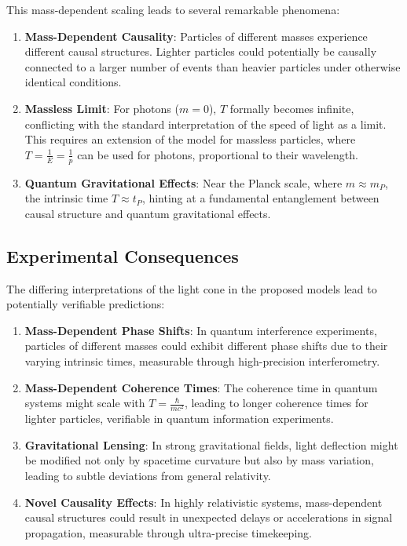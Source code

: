 \documentclass[a4paper,12pt]{article}
\begin{document}
	This mass-dependent scaling leads to several remarkable phenomena:
	
	\begin{enumerate}
		\item \textbf{Mass-Dependent Causality}: Particles of different masses experience different causal structures. Lighter particles could potentially be causally connected to a larger number of events than heavier particles under otherwise identical conditions.
		\item \textbf{Massless Limit}: For photons (\( m = 0 \)), \( T \) formally becomes infinite, conflicting with the standard interpretation of the speed of light as a limit. This requires an extension of the model for massless particles, where \( T = \frac{1}{E} = \frac{1}{p} \) can be used for photons, proportional to their wavelength.
		\item \textbf{Quantum Gravitational Effects}: Near the Planck scale, where \( m \approx m_P \), the intrinsic time \( T \approx t_P \), hinting at a fundamental entanglement between causal structure and quantum gravitational effects.
	\end{enumerate}
	
	\subsection{Experimental Consequences}
	The differing interpretations of the light cone in the proposed models lead to potentially verifiable predictions:
	
	\begin{enumerate}
		\item \textbf{Mass-Dependent Phase Shifts}: In quantum interference experiments, particles of different masses could exhibit different phase shifts due to their varying intrinsic times, measurable through high-precision interferometry.
		\item \textbf{Mass-Dependent Coherence Times}: The coherence time in quantum systems might scale with \( T = \frac{\hbar}{m c^2} \), leading to longer coherence times for lighter particles, verifiable in quantum information experiments.
		\item \textbf{Gravitational Lensing}: In strong gravitational fields, light deflection might be modified not only by spacetime curvature but also by mass variation, leading to subtle deviations from general relativity.
		\item \textbf{Novel Causality Effects}: In highly relativistic systems, mass-dependent causal structures could result in unexpected delays or accelerations in signal propagation, measurable through ultra-precise timekeeping.
	\end{enumerate}
	
\end{document}
